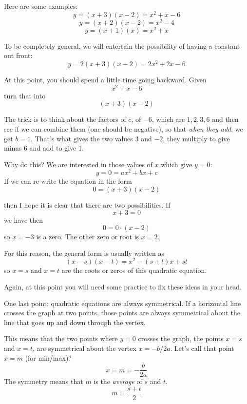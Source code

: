 \documentclass[11pt, oneside]{article}
\begin{document}
Here are some examples:
\[ y = (x + 3)(x - 2) = x^2 + x - 6 \]
\[ y = (x + 2)(x - 2) = x^2 - 4 \]
\[ y = (x + 1)(x) = x^2 + x \]

To be completely general, we will entertain the possibility of having a constant out front:
\[ y = 2(x + 3)(x - 2) = 2x^2 + 2x - 6 \]

At this point, you should spend a little time going backward.  Given
\[ x^2 + x - 6 \]
turn that into
\[ (x + 3)(x - 2) \]

The trick is to think about the factors of $c$, of $-6$, which are $1,2,3,6$ and then see if we can combine them (one should be negative), so that \emph{when they add}, we get $b = 1$.  That's what gives the two values $3$ and $-2$, they multiply to give minus $6$ and add to give $1$.

Why do this?  We are interested in those values of $x$ which give $y = 0$:
\[ y = 0 = ax^2 + bx + c \]
If we can re-write the equation in the form
\[ 0 = (x + 3)(x - 2) \]

then I hope it is clear that there are two possibilities.  If
\[ x + 3 = 0 \]
we have then
\[ 0 = 0 \cdot (x - 2) \]
so $x = -3$ is a zero.  The other zero or root is $x = 2$.

For this reason, the general form is usually written as
\[ (x - s)(x - t) = x^2 - (s + t)x + st \]
so $x = s$ and $x = t$ are the roots or zeros of this quadratic equation.

Again, at this point you will need some practice to fix these ideas in your head.

One last point:  quadratic equations are always symmetrical.  If a horizontal line crosses the graph at two points, those points are always symmetrical about the line that goes up and down through the vertex.

This means that the two points where $y = 0$ crosses the graph, the points $x = s$ and $x = t$, are symmetrical about the vertex $x = -b/2a$.  Let's call that point $x = m$ (for min/max)?
\[ x = m = - \frac{b}{2a} \]
The symmetry means that $m$ is the \emph{average} of $s$ and $t$.
\[ m = \frac{s + t}{2} \]
\end{document}
